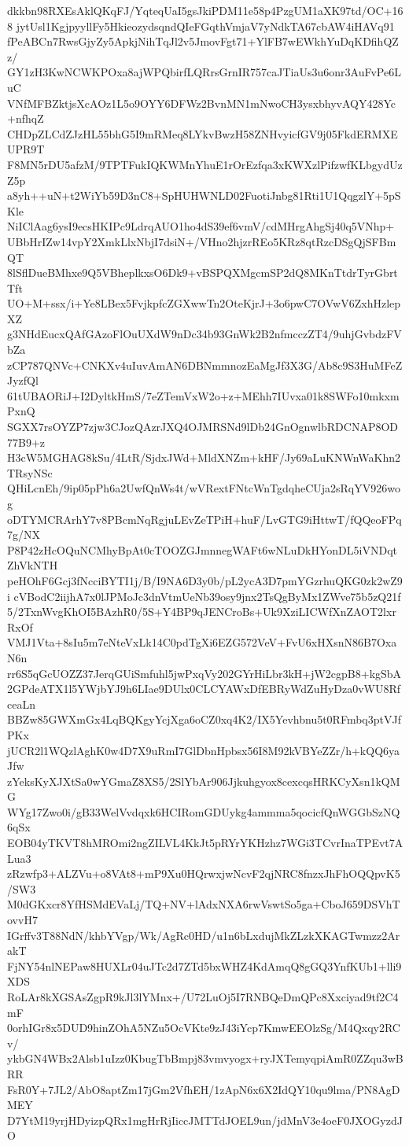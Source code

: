 dkkbn98RXEsAklQKqFJ/YqteqUaI5gsJkiPDM11e58p4PzgUM1aXK97td/OC+168
jytUsl1KgjpyyllFy5HkieozydsqndQIeFGqthVmjaV7yNdkTA67cbAW4iHAVq91
fPeABCn7RwsGjyZy5ApkjNihTqJl2v5JmovFgt71+YlFB7wEWkhYuDqKDfihQZz/
GY1zH3KwNCWKPOxa8ajWPQbirfLQRrsGrnIR757caJTiaUs3u6onr3AuFvPe6LuC
VNfMFBZktjsXcAOz1L5o9OYY6DFWz2BvnMN1mNwoCH3ysxbhyvAQY428Yc+nfhqZ
CHDpZLCdZJzHL55bhG5I9mRMeq8LYkvBwzH58ZNHvyicfGV9j05FkdERMXEUPR9T
F8MN5rDU5afzM/9TPTFukIQKWMnYhuE1rOrEzfqa3xKWXzlPifzwfKLbgydUzZ5p
a8yh++uN+t2WiYb59D3nC8+SpHUHWNLD02FuotiJnbg81Rti1U1QqgzlY+5pSKle
NiIClAag6ysI9ecsHKIPc9LdrqAUO1ho4dS39ef6vmV/cdMHrgAhgSj40q5VNhp+
UBbHrIZw14vpY2XmkLlxNbjI7dsiN+/VHno2hjzrREo5KRz8qtRzcDSgQjSFBmQT
8lSflDueBMhxe9Q5VBheplkxsO6Dk9+vBSPQXMgcmSP2dQ8MKnTtdrTyrGbrtTft
UO+M+ssx/i+Ye8LBex5FvjkpfcZGXwwTn2OteKjrJ+3o6pwC7OVwV6ZxhHzlepXZ
g3NHdEucxQAfGAzoFlOuUXdW9nDc34b93GnWk2B2nfmcczZT4/9uhjGvbdzFVbZa
zCP787QNVc+CNKXv4uIuvAmAN6DBNmmnozEaMgJf3X3G/Ab8c9S3HuMFeZJyzfQl
61tUBAORiJ+I2DyltkHmS/7eZTemVxW2o+z+MEhh7IUvxa01k8SWFo10mkxmPxnQ
SGXX7rsOYZP7zjw3CJozQAzrJXQ4OJMRSNd9lDb24GnOgnwlbRDCNAP8OD77B9+z
H3cW5MGHAG8kSu/4LtR/SjdxJWd+MldXNZm+kHF/Jy69aLuKNWnWaKhn2TRsyNSc
QHiLcnEh/9ip05pPh6a2UwfQnWs4t/wVRextFNtcWnTgdqheCUja2sRqYV926wog
oDTYMCRArhY7v8PBcmNqRgjuLEvZeTPiH+huF/LvGTG9iHttwT/fQQeoFPq7g/NX
P8P42zHcOQuNCMhyBpAt0cTOOZGJmnnegWAFt6wNLuDkHYonDL5iVNDqtZhVkNTH
peHOhF6Gcj3fNcciBYTI1j/B/I9NA6D3y0b/pL2ycA3D7pmYGzrhuQKG0zk2wZ9i
cVBodC2iijhA7x0lJPMoJc3dnVtmUeNb39osy9jnx2TsQgByMx1ZWve75b5zQ21f
5/2TxnWvgKhOI5BAzhR0/5S+Y4BP9qJENCroBs+Uk9XziLICWfXnZAOT2lxrRxOf
VMJ1Vta+8sIu5m7eNteVxLk14C0pdTgXi6EZG572VeV+FvU6xHXsnN86B7OxaN6n
rr6S5qGcUOZZ37JerqGUiSmfuhl5jwPxqVy202GYrHiLbr3kH+jW2cgpB8+kgSbA
2GPdeATX1l5YWjbYJ9h6LIae9DUlx0CLCYAWxDfEBRyWdZuHyDza0vWU8RfceaLn
BBZw85GWXmGx4LqBQKgyYcjXga6oCZ0xq4K2/IX5Yevhbnu5t0RFmbq3ptVJfPKx
jUCR2l1WQzlAghK0w4D7X9uRmI7GlDbnHpbsx56I8M92kVBYeZZr/h+kQQ6yaJfw
zYeksKyXJXtSa0wYGmaZ8XS5/2SlYbAr906Jjkuhgyox8cexcqsHRKCyXsn1kQMG
WYg17Zwo0i/gB33WelVvdqxk6HCIRomGDUykg4ammma5qocicfQnWGGbSzNQ6qSx
EOB04yTKVT8hMROmi2ngZILVL4KkJt5pRYrYKHzhz7WGi3TCvrInaTPEvt7ALua3
zRzwfp3+ALZVu+o8VAt8+mP9Xu0HQrwxjwNcvF2qjNRC8fnzxJhFhOQQpvK5/SW3
M0dGKxcr8YfHSMdEVaLj/TQ+NV+lAdxNXA6rwVswtSo5ga+CboJ659DSVhTovvH7
IGrffv3T88NdN/khbYVgp/Wk/AgRc0HD/u1n6bLxdujMkZLzkXKAGTwmzz2ArakT
FjNY54nlNEPaw8HUXLr04uJTc2d7ZTd5bxWHZ4KdAmqQ8gGQ3YnfKUb1+lli9XDS
RoLAr8kXGSAsZgpR9kJl3lYMnx+/U72LuOj5I7RNBQeDmQPc8Xxciyad9tf2C4mF
0orhIGr8x5DUD9hinZOhA5NZu5OcVKte9zJ43iYcp7KmwEEOlzSg/M4Qxqy2RCv/
ykbGN4WBx2Alsb1uIzz0KbugTbBmpj83vmvyogx+ryJXTemyqpiAmR0ZZqu3wBRR
FsR0Y+7JL2/AbO8aptZm17jGm2VfhEH/1zApN6x6X2IdQY10qu9lma/PN8AgDMEY
D7YtM19yrjHDyizpQRx1mgHrRjIiccJMTTdJOEL9un/jdMnV3e4oeF0JXOGyzdJO
